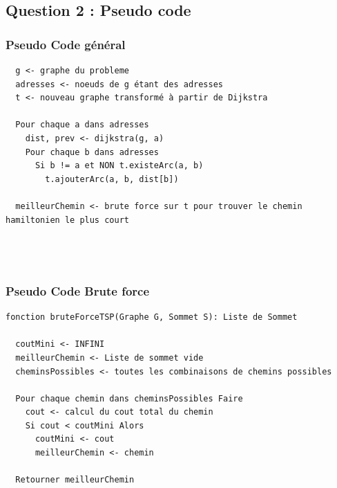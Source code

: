   \subsection{Question 2 : Pseudo code}
      \subsubsection{Pseudo Code général}
        \begin{lstlisting}
  g <- graphe du probleme
  adresses <- noeuds de g étant des adresses
  t <- nouveau graphe transformé à partir de Dijkstra

  Pour chaque a dans adresses
    dist, prev <- dijkstra(g, a)
    Pour chaque b dans adresses
      Si b != a et NON t.existeArc(a, b)
        t.ajouterArc(a, b, dist[b])

  meilleurChemin <- brute force sur t pour trouver le chemin hamiltonien le plus court




        \end{lstlisting}

        \newpage

      \subsubsection{Pseudo Code Brute force}
        \begin{lstlisting}
fonction bruteForceTSP(Graphe G, Sommet S): Liste de Sommet

  coutMini <- INFINI
  meilleurChemin <- Liste de sommet vide
  cheminsPossibles <- toutes les combinaisons de chemins possibles

  Pour chaque chemin dans cheminsPossibles Faire
    cout <- calcul du cout total du chemin
    Si cout < coutMini Alors
      coutMini <- cout
      meilleurChemin <- chemin

  Retourner meilleurChemin




        \end{lstlisting}

  \newpage

